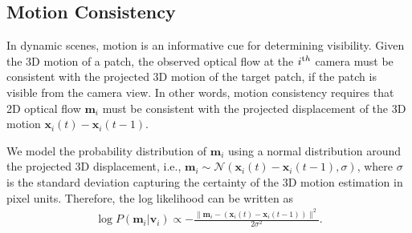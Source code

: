 \subsection{Motion Consistency}\label{sub:Motion-Cue}
In dynamic scenes, motion is an informative cue for determining visibility. Given the 3D motion of a patch, the observed optical flow at the $i^{\textrm th}$ camera must be consistent with the projected 3D motion of the target patch, if the patch is visible from the camera view. In other words, motion consistency requires that 2D optical flow $\mathbf{m}_i$ must be consistent with the projected displacement of the 3D motion $\mathbf{x}_i(t) - \mathbf{x}_i(t-1)$.

We model the probability distribution of $\mathbf{m}_i$ using a normal distribution around the projected 3D displacement, i.e., $\mathbf{m}_i \sim \mathcal{N}\left( \mathbf{x}_i(t) - \mathbf{x}_i(t-1), \sigma \right) $, where $\sigma$ is the standard deviation capturing the certainty of the 3D motion estimation in pixel units. Therefore, the log likelihood can be written as 
\begin{eqnarray}
\log P( \mathbf{m}_i | \mathbf{v}_i) \propto -\frac{\| \mathbf{m}_i - \left( \mathbf{x}_i(t) - \mathbf{x}_i(t-1) \right)  \|^2}{2\sigma^2}.
\label{eq:eq_motion}
\end{eqnarray}

